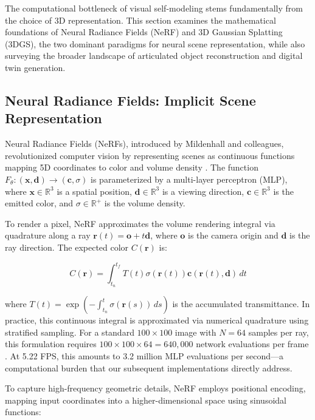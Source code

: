 \documentclass[12pt,a4paper,oneside]{report}
\begin{document}
The computational bottleneck of visual self-modeling stems fundamentally from the choice of 3D representation. This section examines the mathematical foundations of Neural Radiance Fields (NeRF) and 3D Gaussian Splatting (3DGS), the two dominant paradigms for neural scene representation, while also surveying the broader landscape of articulated object reconstruction and digital twin generation.

\subsection{Neural Radiance Fields: Implicit Scene Representation}

Neural Radiance Fields (NeRFs), introduced by Mildenhall and colleagues, revolutionized computer vision by representing scenes as continuous functions mapping 5D coordinates to color and volume density \cite{mildenhall2020nerf}. The function $F_\theta: (\mathbf{x}, \mathbf{d}) \rightarrow (\mathbf{c}, \sigma)$ is parameterized by a multi-layer perceptron (MLP), where $\mathbf{x} \in \mathbb{R}^3$ is a spatial position, $\mathbf{d} \in \mathbb{R}^3$ is a viewing direction, $\mathbf{c} \in \mathbb{R}^3$ is the emitted color, and $\sigma \in \mathbb{R}^+$ is the volume density.

To render a pixel, NeRF approximates the volume rendering integral via quadrature along a ray $\mathbf{r}(t) = \mathbf{o} + t\mathbf{d}$, where $\mathbf{o}$ is the camera origin and $\mathbf{d}$ is the ray direction. The expected color $C(\mathbf{r})$ is:

\begin{equation}
C(\mathbf{r}) = \int_{t_n}^{t_f} T(t) \sigma(\mathbf{r}(t)) \mathbf{c}(\mathbf{r}(t), \mathbf{d}) \, dt
\end{equation}

where $T(t) = \exp\left(-\int_{t_n}^{t} \sigma(\mathbf{r}(s)) \, ds\right)$ is the accumulated transmittance. In practice, this continuous integral is approximated via numerical quadrature using stratified sampling. For a standard $100 \times 100$ image with $N = 64$ samples per ray, this formulation requires $100 \times 100 \times 64 = 640,000$ network evaluations per frame \cite{mildenhall2020nerf}. At 5.22 FPS, this amounts to 3.2 million MLP evaluations per second—a computational burden that our subsequent implementations directly address.

To capture high-frequency geometric details, NeRF employs positional encoding, mapping input coordinates into a higher-dimensional space using sinusoidal functions:
\end{document}
